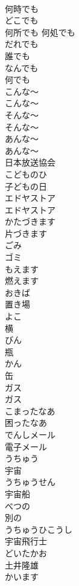 \documentclass[8pt]{extreport}
\begin{document}
\begin{CJK}{UTF8}{min}
\\	何時でも		
\\	どこでも	
\\	何所でも 何処でも		
\\	だれでも	
\\	誰でも		
\\	なんでも	
\\	何でも		
\\	こんな〜	
\\	こんな〜		
\\	そんな〜	
\\	そんな〜		
\\	あんな〜	
\\	あんな〜		
\\	日本放送協会		
\\	こどものひ	
\\	子どもの日		
\\	エドヤストア	
\\	エドヤストア		
\\	かたづきます	
\\	片づきます		
\\	ごみ	
\\	ゴミ		
\\	もえます	
\\	燃えます		
\\	おきば	
\\	置き場		
\\	よこ	
\\	横		
\\	びん	
\\	瓶		
\\	かん	
\\	缶		
\\	ガス	
\\	ガス		
\\	こまったなあ	
\\	困ったなあ		
\\	でんしメール	
\\	電子メール		
\\	うちゅう	
\\	宇宙		
\\	うちゅうせん	
\\	宇宙船		
\\	べつの	
\\	別の		
\\	うちゅうひこうし	
\\	宇宙飛行士		
\\	どいたかお	
\\	土井隆雄		
\\	かいます	

\end{CJK}
\end{document}
